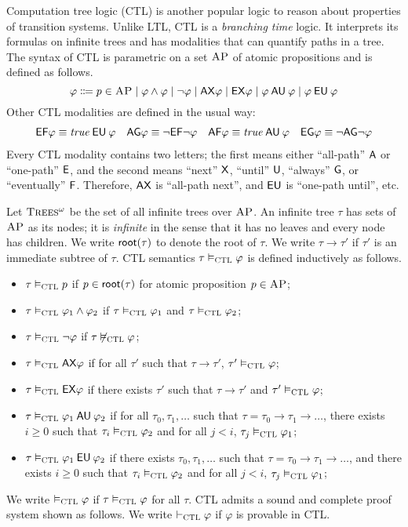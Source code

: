 \documentclass{amsart}
\begin{document}
Computation tree logic (CTL) is another popular logic
to reason about properties of transition systems.
Unlike LTL, CTL is a \emph{branching time} logic.
It interprets its formulas on infinite trees
and has modalities that can quantify paths in a tree.
The syntax of CTL is parametric on a set $\textsc{AP}$ of atomic propositions and
is defined as follows.
$$
\varphi \Coloneqq p \in \textsc{AP} \mid
\varphi \wedge \varphi \mid
\neg \varphi \mid
\mathsf{AX} \varphi \mid
\mathsf{EX} \varphi \mid
\varphi \mathbin{\mathsf{AU}} \varphi \mid
\varphi \mathbin{\mathsf{EU}} \varphi
$$
Other CTL modalities are defined in the usual way:
\begin{align*}
{\mathsf{EF}} \varphi \equiv \mathit{true} \mathbin{\mathsf{EU}} \varphi &&
{\mathsf{AG}} \varphi \equiv \neg {\mathsf{EF}} \neg \varphi &&
{\mathsf{AF}} \varphi \equiv \mathit{true} \mathbin{\mathsf{AU}} \varphi &&
{\mathsf{EG}} \varphi \equiv \neg {\mathsf{AG}} \neg \varphi
\end{align*}
Every CTL modality contains two letters;
the first means either ``all-path'' ${\mathsf{A}}$ or ``one-path'' ${\mathsf{E}}$,
and the second means ``next'' ${\mathsf{X}}$, ``until'' $\mathbin{\mathsf{U}}$, ``always'' ${\mathsf{G}}$,
or ``eventually'' ${\mathsf{F}}$.
Therefore, $\mathsf{AX}$ is ``all-path next'', and $\mathbin{\mathsf{EU}}$ is ``one-path until'', etc.

Let $\textsc{Trees$^\omega$}$ be the set of all infinite trees over $\textsc{AP}$.
An infinite tree $\tau$ has sets of $\textsc{AP}$ as its nodes;
it is \emph{infinite} in the sense that it has no leaves
and every node has children.
We write $\mathsf{root}(\tau)$ to denote the root of $\tau$.
We write $\tau \to \tau'$ 
if $\tau'$ is an immediate subtree of $\tau$.
CTL semantics $\tau \vDash_{\textsc{CTL}} \varphi$ is defined inductively as follows.
\begin{itemize}
\item $\tau \vDash_{\textsc{CTL}} p$ if $p \in \mathsf{root}(\tau)$ for atomic proposition $p \in \textsc{AP}$;
\item $\tau \vDash_{\textsc{CTL}} \varphi_1 \wedge \varphi_2$ if
      $\tau \vDash_{\textsc{CTL}} \varphi_1$ and $\tau \vDash_{\textsc{CTL}} \varphi_2$;
\item $\tau \vDash_{\textsc{CTL}} \neg \varphi$ if
      $\tau \not\vDash_{\textsc{CTL}} \varphi$;
\item $\tau \vDash_{\textsc{CTL}} \mathsf{AX} \varphi$ if
      for all $\tau'$ such that $\tau \to \tau'$, $\tau' \vDash_{\textsc{CTL}} \varphi$;
\item $\tau \vDash_{\textsc{CTL}} \mathsf{EX} \varphi$ if
	  there exists $\tau'$ such that $\tau \to \tau'$ and $\tau' \vDash_{\textsc{CTL}} \varphi$;
\item $\tau \vDash_{\textsc{CTL}} \varphi_1 \mathbin{\mathsf{AU}} \varphi_2$ if
      for all $\tau_0,\tau_1,\dots$ such that
      $\tau = \tau_0 \to \tau_1 \to \dots$,
      there exists $i \ge 0$ such that
      $\tau_i \vDash_{\textsc{CTL}} \varphi_2$
      and for all $j < i$, $\tau_j \vDash_{\textsc{CTL}} \varphi_1$;
\item $\tau \vDash_{\textsc{CTL}} \varphi_1 \mathbin{\mathsf{EU}} \varphi_2$ if
      there exists $\tau_0,\tau_1,\dots$ such that
      $\tau = \tau_0 \to \tau_1 \to \dots$, and
      there exists $i \ge 0$ such that
      $\tau_i \vDash_{\textsc{CTL}} \varphi_2$
      and for all $j < i$, $\tau_j \vDash_{\textsc{CTL}} \varphi_1$;
\end{itemize}
We write $\vDash_{\textsc{CTL}} \varphi$ if $\tau \vDash_{\textsc{CTL}}\varphi$ for all $\tau$.
CTL admits a sound and complete proof system shown as follows.
We write $\vdash_{\textsc{CTL}}\varphi$ if $\varphi$ is provable in CTL.
\end{document}
